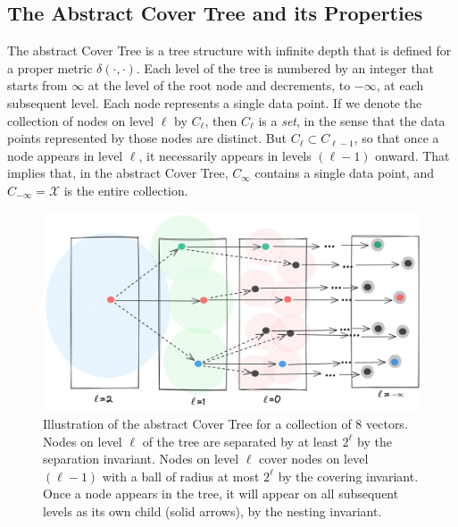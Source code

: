 \subsection{The Abstract Cover Tree and its Properties}

The abstract Cover Tree is a tree structure with infinite depth
that is defined for a proper metric $\delta(\cdot, \cdot)$.
Each level of the tree is numbered by an integer that starts
from $\infty$ at the level of the root node and decrements, to $-\infty$,
at each subsequent level.
Each node represents a single data point.
If we denote the collection of nodes on level $\ell$ by $C_\ell$,
then $C_\ell$ is a \emph{set}, in the sense that the
data points represented by those nodes are distinct.
But $C_\ell \subset C_{\ell - 1}$, so that once a node
appears in level $\ell$, it necessarily appears in levels $(\ell - 1)$
onward. That implies that, in the abstract Cover Tree, $C_\infty$ contains
a single data point, and $C_{-\infty} = \mathcal{X}$ is the entire collection.

\begin{figure}[t]
    \centering
    \includegraphics[width=0.7\linewidth]{figures/branch-and-bound-abstract-cover-tree.png}
    \caption{Illustration of the abstract Cover Tree for a collection of $8$ vectors.
    Nodes on level $\ell$ of the tree are separated by at least $2^\ell$ by the separation invariant.
    Nodes on level $\ell$ cover nodes on level $(\ell - 1)$ with a ball of radius
    at most $2^\ell$ by the covering invariant.
    Once a node appears in the tree, it will appear on all subsequent
    levels as its own child (solid arrows), by the nesting invariant.}
    \label{figure:branch-and-bound:abstract-cover-tree}
\end{figure}


